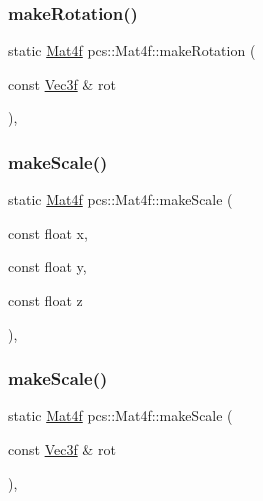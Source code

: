 \mbox{\label{structpcs_1_1Mat4f_a46b7418d93345a9609304b54fea5ed98}} 
\subsubsection{\texorpdfstring{make\+Rotation()}{makeRotation()}\hspace{0.1cm}{\footnotesize\ttfamily [2/2]}}
{\footnotesize\ttfamily static \hyperlink{structpcs_1_1Mat4f}{Mat4f} pcs\+::\+Mat4f\+::make\+Rotation (\begin{DoxyParamCaption}\item[{const \hyperlink{namespacepcs_a68e0f517680976c17c810ffe6952cbab}{Vec3f} \&}]{rot }\end{DoxyParamCaption})\hspace{0.3cm}{\ttfamily [inline]}, {\ttfamily [static]}}

\mbox{\label{structpcs_1_1Mat4f_a76bf290cb265ba821bb1bb04b822f361}} 
\subsubsection{\texorpdfstring{make\+Scale()}{makeScale()}\hspace{0.1cm}{\footnotesize\ttfamily [1/2]}}
{\footnotesize\ttfamily static \hyperlink{structpcs_1_1Mat4f}{Mat4f} pcs\+::\+Mat4f\+::make\+Scale (\begin{DoxyParamCaption}\item[{const float}]{x,  }\item[{const float}]{y,  }\item[{const float}]{z }\end{DoxyParamCaption})\hspace{0.3cm}{\ttfamily [inline]}, {\ttfamily [static]}}

\mbox{\label{structpcs_1_1Mat4f_a7d4f035fc516774ddc99f17333712a69}} 
\subsubsection{\texorpdfstring{make\+Scale()}{makeScale()}\hspace{0.1cm}{\footnotesize\ttfamily [2/2]}}
{\footnotesize\ttfamily static \hyperlink{structpcs_1_1Mat4f}{Mat4f} pcs\+::\+Mat4f\+::make\+Scale (\begin{DoxyParamCaption}\item[{const \hyperlink{namespacepcs_a68e0f517680976c17c810ffe6952cbab}{Vec3f} \&}]{rot }\end{DoxyParamCaption})\hspace{0.3cm}{\ttfamily [inline]}, {\ttfamily [static]}}

